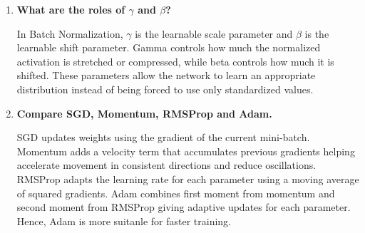 \documentclass[10pt]{article}
\begin{document}
\begin{enumerate}
\textbf{Mini-Batch Variance}
\begin{equation}
\sigma_{\mathcal{B}}^2 = \frac{1}{m} \sum_{i=1}^{m} (x_i - \mu_{\mathcal{B}})^2
\end{equation}

\textbf{Normalization}
\begin{equation}
\hat{x}_i = \frac{x_i - \mu_{\mathcal{B}}}{\sqrt{\sigma_{\mathcal{B}}^2 + \epsilon}}
\end{equation}

\textbf{Scale and Shift Transformation}
\begin{equation}
y_i = \gamma \hat{x}_i + \beta
\end{equation}

\textbf{where,}
\begin{itemize}
    \item $\epsilon$ - A small numerical constant to prevent division by zero.
    \item $\gamma, \beta$ - Learnable parameters updated during training via backpropagation.
\end{itemize}
\vspace{3mm}

\item \textbf{What are the roles of $\gamma$ and $\beta$?}

\vspace{5mm}
In Batch Normalization, $\gamma$ is the learnable scale parameter and $\beta$ is the learnable shift parameter.
Gamma controls how much the normalized activation is stretched or compressed, while beta controls how much it is shifted. 
These parameters allow the network to learn an appropriate distribution instead of being forced to use only standardized values.
\vspace{3mm}

\item \textbf{Compare SGD, Momentum, RMSProp and Adam.}

\vspace{5mm}
SGD updates weights using the gradient of the current mini-batch. 
Momentum adds a velocity term that accumulates previous gradients helping accelerate movement in consistent directions and reduce oscillations. 
RMSProp adapts the learning rate for each parameter using a moving average of squared gradients. 
Adam combines first moment from momentum and second moment from RMSProp giving adaptive updates for each parameter. 
Hence, Adam is more suitanle for faster training.
\vspace{3mm}


\end{enumerate}
\end{document}
